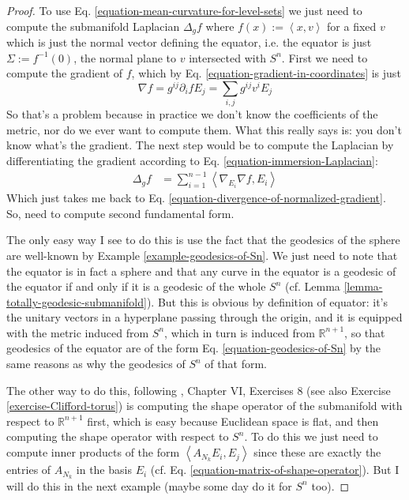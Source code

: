 \begin{proof}
To use Eq. \ref{equation-mean-curvature-for-level-sets} we just need to compute
the submanifold Laplacian $\Delta_gf$ where $f(x):=\left<x,v\right>$ for a fixed
$v$ which is just the normal vector defining the equator, i.e. the equator is
just  $\Sigma:=f^{-1}(0)$, the normal plane to $v$ intersected with $S^n$. First
we need to compute the gradient of $f$, which by Eq.
\ref{equation-gradient-in-coordinates} is just
$$
\nabla f=g^{ij}\partial_ifE_j=\sum_{i,j}g^{ij}v^iE_j
$$
So that's a problem because in practice we don't know the coefficients of the
metric, nor do we ever want to compute them. What this really says is: you don't
know what's the gradient. The next step would be to compute the Laplacian by
differentiating the gradient
according to Eq. \ref{equation-immersion-Laplacian}:
\begin{align*}
\Delta_gf&=\sum_{i=1}^{n-1}\left<\nabla_{E_i}\nabla f,E_i\right>
\end{align*}
Which just takes me back to Eq.
\ref{equation-divergence-of-normalized-gradient}. So, need
to compute second fundamental form.

The only easy way I see to do this is use the fact that the geodesics of the
sphere are well-known by Example \ref{example-geodesics-of-Sn}. We just need to
note that the equator is in fact a sphere and that any curve in the equator is a
geodesic of the equator if and only if it is a geodesic of the whole $S^n$ (cf.
Lemma \ref{lemma-totally-geodesic-submanifold}). But this is obvious by
definition of equator: it's the unitary vectors in a hyperplane passing through
the origin, and it is equipped with the metric induced from $S^n$, which in turn
is induced from $\mathbb{R}^{n+1}$, so that geodesics of the equator are of the
form Eq. \ref{equation-geodesics-of-Sn} by the same reasons as why the geodesics
of $S^n$ of that form.

The other way to do this, following \cite{doc}, Chapter VI, Exercises 8 (see also
Exercise \ref{exercise-Clifford-torus}) is computing the shape operator of the
submanifold with respect to $\mathbb{R}^{n+1}$ first, which is easy because
Euclidean space is flat, and then computing the shape operator with respect to
$S^n$. To do this we just need to compute inner products of the form
$\left<A_{N_k}E_i,E_j\right>$ since these are exactly the entries of $A_{N_k}$
in the basis $E_i$ (cf. Eq. \ref{equation-matrix-of-shape-operator}). But I will
do this in the next example (maybe some day do it for $S^n$ too).
\end{proof}

